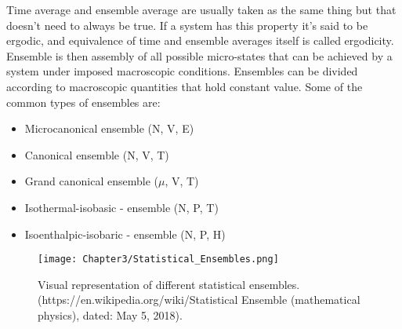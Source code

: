 Time average and ensemble average are usually taken as the same thing but that  doesn't need to always be true. If a system has this property it's said to be ergodic, and equivalence of time and ensemble averages itself is called ergodicity. Ensemble is then assembly of all possible micro-states that can be achieved by a system under imposed macroscopic conditions. Ensembles can be divided according to macroscopic quantities that hold constant value. Some of the common  types of ensembles are:

\begin{itemize}
\item Microcanonical ensemble (N, V, E)
\item Canonical ensemble (N, V, T)
\item Grand canonical ensemble ($\mu$, V, T)
\item  Isothermal-isobasic - ensemble (N, P, T)
\item Isoenthalpic-isobaric -  ensemble (N, P, H)
\end{itemize}

\begin{figure}[h!]
\centering
\texttt{[image: Chapter3/Statistical\_Ensembles.png]}
\caption {Visual representation of different statistical ensembles. (https://en.wikipedia.org/wiki/Statistical Ensemble (mathematical physics), dated: May 5, 2018).}  
\end{figure}
